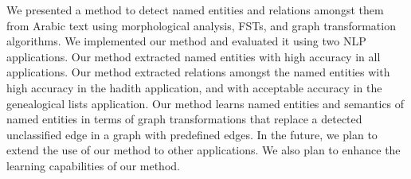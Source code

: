 \documentclass{llncs}
\begin{document}
We presented a method to detect named entities and relations amongst them from 
Arabic text using morphological analysis, FSTs, and 
graph transformation algorithms. 
We implemented our method and evaluated it using two NLP applications.
Our method extracted named entities with high accuracy in all applications.
Our method extracted relations amongst the named entities with high accuracy in the hadith application, 
and with acceptable accuracy in the genealogical lists application. 
Our method learns named entities and semantics of named entities in terms of graph transformations that 
replace a detected unclassified edge in a graph with predefined edges. 
In the future, we plan to extend the use of our method to other applications. 
We also plan to enhance the learning capabilities of our method.












%


{\small }

\nocite{completeBibleGenealogy:Online}
\end{document}
